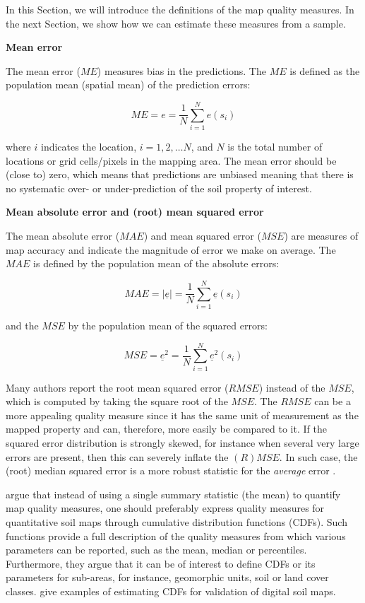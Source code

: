 \documentclass[10pt,b5paper,]{book}
\theoremstyle{definition}
\theoremstyle{definition}
\theoremstyle{definition}
\theoremstyle{remark}
\begin{document}
In this Section, we will introduce the definitions of the map quality
measures. In the next Section, we show how we can estimate these
measures from a sample.

\textbf{Mean error}

The mean error (\({ME}\)) measures bias in the predictions. The \({ME}\)
is defined as the population mean (spatial mean) of the prediction
errors:

\begin{equation}
M E = e = \frac{1}{N} \sum_{i=1}^{N} e (s_i)
\end{equation}

where \(i\) indicates the location, \({i = 1, 2,\dots N}\), and \(N\) is
the total number of locations or grid cells/pixels in the mapping area.
The mean error should be (close to) zero, which means that predictions
are unbiased meaning that there is no systematic over- or
under-prediction of the soil property of interest.

\textbf{Mean absolute error and (root) mean squared error}

The mean absolute error (\({MAE}\)) and mean squared error (\({MSE}\))
are measures of map accuracy and indicate the magnitude of error we make
on average. The \({MAE}\) is defined by the population mean of the
absolute errors:

\begin{equation}
M A E = |\underline{e}| = \frac{1}{N} \sum_{i=1}^{N} \underline{e} (s_i)
\end{equation}

and the \({MSE}\) by the population mean of the squared errors:

\begin{equation}
M S E = \underline{e}^2 = \frac{1}{N} \sum_{i=1}^{N} \underline{e}^2 (s_i)
\end{equation}

Many authors report the root mean squared error (\({RMSE}\)) instead of
the \({MSE}\), which is computed by taking the square root of the
\({MSE}\). The \({RMSE}\) can be a more appealing quality measure since
it has the same unit of measurement as the mapped property and can,
therefore, more easily be compared to it. If the squared error
distribution is strongly skewed, for instance when several very large
errors are present, then this can severely inflate the \((R)MSE\). In
such case, the (root) median squared error is a more robust statistic
for the \emph{average} error \citep{kempen2012efficiency}.

\citet{brus2011sampling} argue that instead of using a single summary
statistic (the mean) to quantify map quality measures, one should
preferably express quality measures for quantitative soil maps through
cumulative distribution functions (CDFs). Such functions provide a full
description of the quality measures from which various parameters can be
reported, such as the mean, median or percentiles. Furthermore, they
argue that it can be of interest to define CDFs or its parameters for
sub-areas, for instance, geomorphic units, soil or land cover classes.
\citet{brus2011sampling} give examples of estimating CDFs for validation
of digital soil maps.
\end{document}
